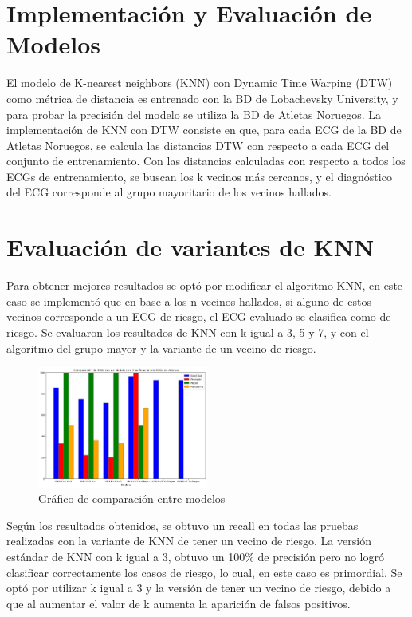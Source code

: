\documentclass[conference]{IEEEtran}
\begin{document}
\section{Implementación y Evaluación de Modelos}
El modelo de K-nearest neighbors (KNN) con Dynamic Time Warping (DTW) como métrica de distancia
 es entrenado con la BD de Lobachevsky University, y para probar la precisión del modelo se 
 utiliza la BD de Atletas Noruegos.
La implementación de KNN con DTW consiste en que, para cada ECG de la BD de Atletas Noruegos,
 se calcula las distancias DTW con respecto a cada ECG del conjunto de entrenamiento.
  Con las distancias calculadas con respecto a todos los ECGs de entrenamiento, se buscan los
   k vecinos más cercanos, y el diagnóstico del ECG corresponde al grupo mayoritario de los vecinos hallados.

\section{Evaluación de variantes de KNN}
Para obtener mejores resultados se optó por modificar el algoritmo KNN, en este caso se 
implementó que en base a los n vecinos hallados, si alguno de estos vecinos corresponde 
a un ECG de riesgo, el ECG evaluado se clasifica como de riesgo.
Se evaluaron los resultados de KNN con k igual a 3, 5 y 7, y con el algoritmo del grupo mayor 
y la variante de un vecino de riesgo.

\begin{figure}[H]
    \includegraphics[width=0.5\textwidth]{./graficos/comparacionKNN.png}
    \caption{Gráfico de comparación entre modelos}
\end{figure}

Según los resultados obtenidos, se obtuvo un recall en todas las pruebas realizadas 
con la variante de KNN de tener un vecino de riesgo. La versión estándar de KNN con k igual a 3, 
obtuvo un 100\% de precisión pero no logró clasificar correctamente los casos de riesgo, lo cual, 
en este caso es primordial. Se optó por utilizar k igual a 3 y la versión de tener un vecino de riesgo,
 debido a que al aumentar el valor de k aumenta la aparición de falsos positivos.
\end{document}
